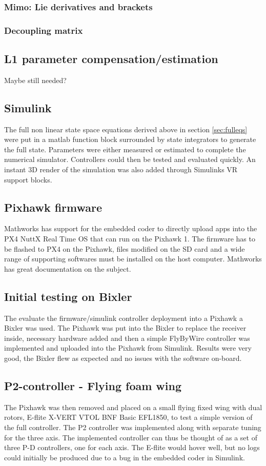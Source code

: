 \documentclass{article}
\begin{document}
\subsubsection{Mimo: Lie derivatives and brackets}
\subsubsection{Decoupling matrix}
\subsection{L1 parameter compensation/estimation}
Maybe still needed?


\subsection{Simulink}
The full non linear state space equations derived above in section \ref{sec:fulleqs} were put in a matlab function block surrounded by state integrators to generate the full state.
Parameters were either measured or estimated to complete the numerical simulator.
Controllers could then be tested and evaluated quickly.
An instant 3D render of the simulation was also added through Simulinks VR support blocks.

\subsection{Pixhawk firmware}
Mathworks has support for the embedded coder to directly upload apps into the PX4 NuttX Real Time OS that can run on the Pixhawk 1.
The firmware has to be flashed to PX4 on the Pixhawk, files modified on the SD card and a wide range of supporting softwares must be installed on the host computer.
Mathworks has great documentation on the subject.\cite{MathworksPX4}

\subsection{Initial testing on Bixler}
The evaluate the firmware/simulink controller deployment into a Pixhawk a Bixler was used.
The Pixhawk was put into the Bixler to replace the receiver inside, necessary hardware added and then a simple FlyByWire controller was implemented and uploaded into the Pixhawk from Simulink.
Results were very good, the Bixler flew as expected and no issues with the software on-board.
\subsection{P2-controller - Flying foam wing}
The Pixhawk was then removed and placed on a small flying fixed wing with dual rotors, E-flite X-VERT VTOL BNF Basic EFL1850, to test a simple version of the full controller.
The P2 controller \cite{P2} was implemented along with separate tuning for the three axis.
The implemented controller can thus be thought of as a set of three P-D controllers, one for each axis.
The E-flite would hover well, but no logs could initially be produced due to a bug in the embedded coder in Simulink.
\end{document}
